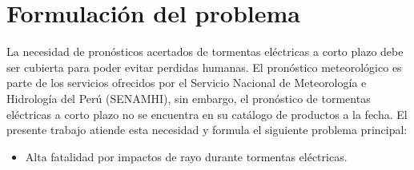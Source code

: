 \section{Formulación del problema}

La necesidad de pronósticos acertados de tormentas eléctricas a corto plazo 
debe ser cubierta para poder evitar perdidas humanas. El pronóstico 
meteorológico es parte de los servicios ofrecidos por el Servicio Nacional de 
Meteorología e Hidrología del Perú (SENAMHI), sin embargo, el pronóstico de 
tormentas eléctricas a corto plazo no se encuentra en su catálogo de productos 
a la fecha. El presente trabajo atiende esta necesidad y formula el siguiente
problema principal:

\begin{itemize}
  \item Alta fatalidad por impactos de rayo durante tormentas eléctricas.
\end{itemize}


